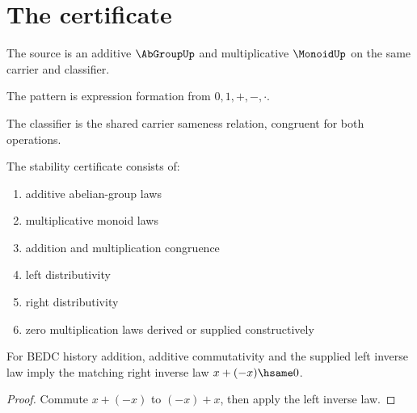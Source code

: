 \section{The certificate}

\begin{definition}
\label{def:ring-source-specification}
The source is an additive \(\AbGroupUp\) and multiplicative \(\MonoidUp\) on the same carrier and classifier.
\end{definition}

\begin{definition}
\label{def:ring-pattern-specification}
The pattern is expression formation from \(0,1,+,-,\cdot\).
\end{definition}

\begin{definition}
\label{def:ring-classifier-specification}
The classifier is the shared carrier sameness relation, congruent for both operations.
\end{definition}

\begin{definition}
\label{def:ring-stability-certificate}
The stability certificate consists of:
\begin{enumerate}
  \item additive abelian-group laws
  \item multiplicative monoid laws
  \item addition and multiplication congruence
  \item left distributivity
  \item right distributivity
  \item zero multiplication laws derived or supplied constructively
\end{enumerate}
\end{definition}

\begin{theorem}
\label{thm:ring-add-right-inverse}
For BEDC history addition, additive commutativity and the supplied left inverse
law imply the matching right inverse law \(x+(-x)\hsame0\).
\end{theorem}
\begin{proof}
Commute \(x+(-x)\) to \((-x)+x\), then apply the left inverse law.
\end{proof}

